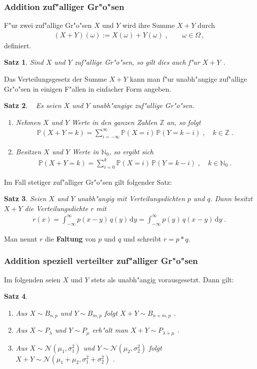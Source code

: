 \documentclass[ngerman,draft,parskip=half,twoside]{scrartcl}
\newtheorem{thm}{Satz}[section]
\newcommand*{\N}{\mathbb{N}}      %
\newcommand*{\Z}{\mathbb{Z}}      %
\newcommand*{\WKM}{\mathbb{P}}      %
\begin{document}
\subsubsection{Addition zuf"alliger Gr"o"sen}
F"ur zwei zuf"allige Gr"o"sen $X$  und $Y$ wird ihre Summe $X+Y$ durch
\begin{gather*}
  (X+Y)(\omega):=X(\omega)+Y(\omega)\;,\qquad \omega\in\Omega\,,
\end{gather*}
definiert.
\begin{thm}
Sind $X$ und $Y$ zuf"allige Gr"o"sen, so gilt dies auch f"ur $X+Y$ .
\end{thm}
Das Verteilungsgesetz der Summe $X+Y$ kann man f"ur unabh"angige zuf"allige Gr"o"sen in einigen
F"allen in einfacher Form angeben.
\begin{thm}~
Es seien $X$ und $Y$ unabh"angige zuf"allige Gr"o"sen.
\begin{enumerate}
\item
Nehmen $X$ und $Y$ Werte in den ganzen Zahlen $\Z$ an, so folgt
  \begin{gather*}
    \WKM(X+Y=k)=\sum_{i=-\infty}^\infty\WKM(X=i)\,\WKM(Y=k-i)\;,\quad k\in \Z\;.
  \end{gather*}
\item
Besitzen $X$ und $Y$ Werte in $\N_0$, so ergibt sich
  \begin{gather*}
    \WKM(X+Y=k)=\sum_{i=0}^k\WKM(X=i)\,\WKM(Y=k-i)\;,\quad k\in \N_0\;.
  \end{gather*}
\end{enumerate}
\end{thm}
Im Fall stetiger zuf"alliger Gr"o"sen gilt folgender Satz:
\begin{thm}
Seien $X$ und $Y$ unabh"angig mit Verteilungsdichten $p$ und $q$. Dann besitzt $X+Y$
die Verteilungsdichte $r$  mit
  \begin{gather*}
    r(x)=\int_{-\infty}^\infty p(x-y)\,q(y)\,\mathrm d y = \int_{-\infty}^\infty p(y)\,q(x-y)\,\mathrm d y \;.
  \end{gather*}
\end{thm}
Man nennt $r$ die \textbf{Faltung} von $p$ und $q$ und schreibt $r=p*q$.
\subsubsection{Addition speziell verteilter zuf"alliger Gr"o"sen}
Im folgenden seien $X$ und $Y$ stets als unabh"angig vorausgesetzt. Dann gilt:
\begin{thm}~
\begin{enumerate}
\item[\rm (a)]
Aus $X\sim B_{n,p}$ und $Y\sim B_{m,p}$ folgt $X+Y\sim B_{n+m,p}$  .
\item[\rm (b)]
Aus $X\sim P_\lambda$ und $Y\sim P_\mu$ erh"alt man $X+Y\sim P_{\lambda+\mu}$ .
\item[\rm (c)]
Aus $X\sim\mathcal N(\mu_1,\sigma_1^2)$ und $Y\sim\mathcal N(\mu_2,\sigma_2^2)$ folgt
$X+Y\sim \mathcal N(\mu_1+\mu_2,\sigma_1^2+\sigma_2^2)$ .
\end{enumerate}
\end{thm}
\end{document}
